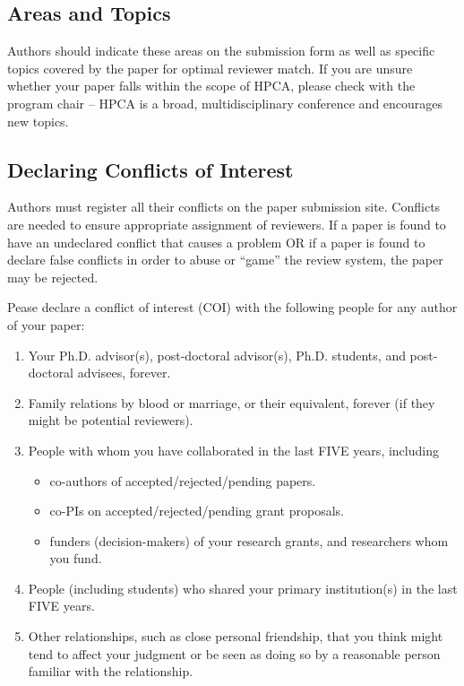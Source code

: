 \documentclass{sig-alternate}
\begin{document}
\subsection{Areas and Topics}

Authors should indicate these areas on the submission form as
well as specific topics covered by the paper for optimal reviewer match. If
you are unsure whether your paper falls within the scope of HPCA, please
check with the program chair -- HPCA is a broad, multidisciplinary
conference and encourages new topics.

\subsection{Declaring Conflicts of Interest}

Authors must register all their conflicts on the paper submission site.
Conflicts are needed to ensure appropriate assignment of reviewers.
If a paper is found to have an undeclared conflict that causes
a problem OR if a paper is found to declare false conflicts in order to
abuse or ``game'' the review system, the paper may be rejected.

Pease declare a conflict of interest (COI) with the following people for any author of your paper:

\begin{enumerate}
\item Your Ph.D. advisor(s), post-doctoral advisor(s), Ph.D. students,
      and post-doctoral advisees, forever.
\item Family relations by blood or marriage, or their equivalent,
      forever (if they might be potential reviewers).
\item People with whom you have collaborated in the last FIVE years, including
\begin{itemize}
\item co-authors of accepted/rejected/pending papers.
\item co-PIs on accepted/rejected/pending grant proposals.
\item funders (decision-makers) of your research grants, and researchers
      whom you fund.
\end{itemize}
\item People (including students) who shared your primary institution(s) in the
last FIVE years.
\item Other relationships, such as close personal friendship, that you think might tend
to affect your judgment or be seen as doing so by a reasonable person familiar
with the relationship.
\end{enumerate}
\end{document}
